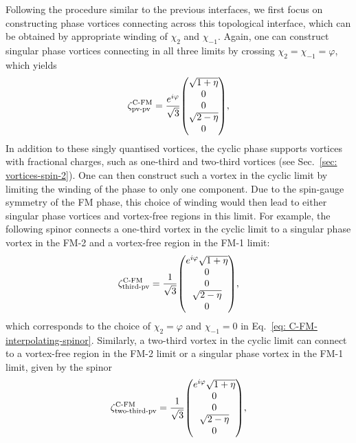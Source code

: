 Following the procedure similar to the previous interfaces, we first focus on
constructing phase vortices connecting across this topological interface, which
can be obtained by appropriate winding of \(\chi_2\) and \(\chi_{-1}\).
Again, one can construct singular phase vortices connecting in all three limits
by crossing \(\chi_2 = \chi_{-1} = \varphi \), which yields
\begin{align}\label{eq: C-FM-pv-pv}
    \zeta^\text{C-FM}_\text{pv-pv} = \frac{e^{i\varphi}}{\sqrt{3}}\mqty(
        \sqrt{1 + \eta} \\
        0 \\
        0 \\
        \sqrt{2 - \eta} \\
        0
    ),
\end{align}
In addition to these singly quantised vortices, the cyclic phase supports
vortices with fractional charges, such as one-third and two-third vortices (see
Sec.~\ref{sec: vortices-spin-2}).
One can then construct such a vortex in the cyclic limit by limiting the winding
of the phase to only one component.
Due to the spin-gauge symmetry of the FM phase, this choice of winding would
then lead to either singular phase vortices and vortex-free regions in this
limit.
For example, the following spinor connects a one-third vortex in the cyclic
limit to a singular phase vortex in the FM-2 and a vortex-free region in the
FM-1 limit:
\begin{align}\label{eq: C-FM-third-pv}
    \zeta^\text{C-FM}_\text{third-pv} = \frac{1}{\sqrt{3}}\mqty(
        e^{i\varphi}\sqrt{1 + \eta} \\
        0 \\
        0 \\
        \sqrt{2 - \eta} \\
        0
    ),
\end{align}
which corresponds to the choice of \(\chi_2 = \varphi \) and \(\chi_{-1} = 0\)
in Eq.~\eqref{eq: C-FM-interpolating-spinor}.
Similarly, a two-third vortex in the cyclic limit can connect to a vortex-free
region in the FM-2 limit or a singular phase vortex in the FM-1 limit, given by
the spinor
\begin{align}\label{eq: C-FM-2third-vf}
    \zeta^\text{C-FM}_\text{two-third-pv} = \frac{1}{\sqrt{3}}\mqty(
        e^{i\varphi}\sqrt{1 + \eta} \\
        0 \\
        0 \\
        \sqrt{2 - \eta} \\
        0
    ),
\end{align}
